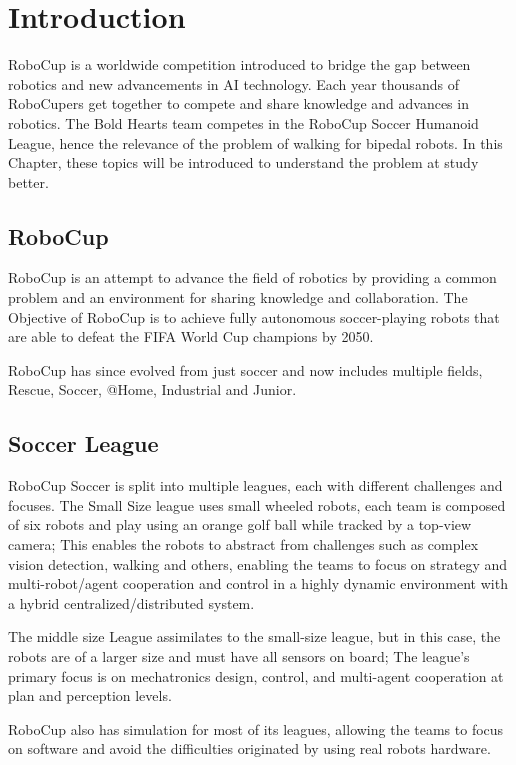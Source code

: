 \chapter{Introduction}
 RoboCup is a worldwide competition introduced to bridge the gap between robotics and new advancements in AI technology. Each year thousands of RoboCupers get together to compete and share knowledge and advances in robotics. The Bold Hearts team competes in the RoboCup Soccer Humanoid League, hence the relevance of the problem of  walking for bipedal robots. In this Chapter, these topics will be introduced to understand the problem at study better.

 \section{RoboCup}
 RoboCup is an attempt to advance the field of robotics by providing a common problem and an environment for sharing knowledge and collaboration.
 The Objective of RoboCup is to achieve fully autonomous soccer-playing robots that are able to defeat the FIFA World Cup champions by 2050. 

 RoboCup has since evolved from just soccer and now includes multiple fields, Rescue, Soccer, @Home, Industrial and Junior.
 \cite{RoboCup}

 \section{Soccer League}
 RoboCup Soccer is split into multiple leagues, each with different challenges and focuses. The Small Size league uses small wheeled robots, 
 each team is composed of six robots and play using an orange golf ball while tracked by a top-view camera;
 This enables the robots to abstract from challenges such as complex vision detection, 
 walking and others, enabling the teams to focus on strategy and multi-robot/agent cooperation and 
 control in a highly dynamic environment with a hybrid centralized/distributed system. 

 The middle size League assimilates to the small-size league, but in this case, the robots are of a larger size and must have all sensors on board; 
 The league's primary focus is on mechatronics design, control, and multi-agent cooperation at plan and perception levels.

 RoboCup also has simulation for most of its leagues, allowing the teams to focus on software and avoid the difficulties originated by using real robots hardware.

